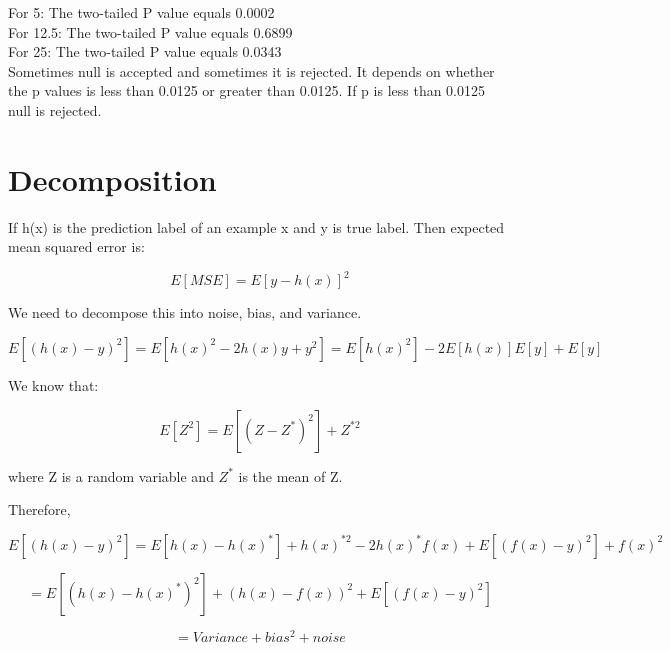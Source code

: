 \documentclass[12pt]{article}
\begin{document}
For 5:
  The two-tailed P value equals 0.0002   \\

For 12.5:
  The two-tailed P value equals 0.6899    \\

For 25:
  The two-tailed P value equals 0.0343   \\


Sometimes null is accepted and sometimes it is rejected. It depends on whether the p values is 
less than 0.0125 or greater than 0.0125. If p is less than 0.0125 null is rejected.

\section{Decomposition}

If h(x) is the prediction label of an example x and y is true label.
Then expected mean squared error is:

\begin{equation}
E[MSE] = E[y-h(x)]^2
\end{equation}

We need to decompose this into noise, bias, and variance.

\begin{equation}
 E[(h(x) -y)^2] = E[h(x)^2 -2h(x)y + y^2] = E[h(x)^2] -2 E[h(x)] E[y] +E[y]
\end{equation}

We know that:

\begin{equation}
E[Z^2] = E[(Z-Z^*)^2] + Z^{*2}
\end{equation}

where Z is a random variable and $Z^*$ is the mean of Z. 

Therefore,

\begin{equation}
 E[(h(x) -y)^2]  = E[h(x) - h(x)^*] + h(x)^{*2} - 2 h(x)^* f(x) + E[(f(x) -y)^2] + f(x)^2
\end{equation}

\begin{equation}
= E[(h(x) - h(x)^*)^2] + (h(x) - f(x))^2 + E[(f(x) - y)^2]
\end{equation}

\begin{equation}
= Variance + bias^2 + noise
\end{equation}
\end{document}
